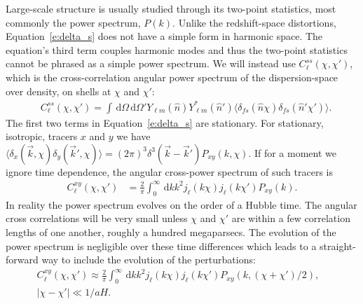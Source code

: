 \documentclass[twocolumn,prl,nofootinbib,floatfix]{revtex4-1}
\newcommand{\ud}{\,\mathrm{d}}
\begin{document}
Large-scale structure is usually studied through its two-point statistics, most
commonly the power spectrum, $P(k)$.
Unlike the redshift-space distortions, Equation~\ref{e:delta_s} does not have a
simple form in harmonic space. The equation's third term couples harmonic modes
and thus the two-point statistics cannot be phrased as a simple power spectrum.
We will instead use $C^{ss}_\ell(\chi,\chi')$, which is
the cross-correlation angular power spectrum of the dispersion-space over density,
on shells at $\chi$ and $\chi'$:
\begin{align}
    &C^{ss}_\ell(\chi, \chi') =
    \int\ud\Omega\ud\Omega' Y_{\ell m}(\hat n) Y^*_{\ell m}(\hat n')
    \langle \delta_{fs}(\hat n \chi) \delta_{fs}(\hat n' \chi')
        \rangle.
\end{align}
The first two terms in Equation~\ref{e:delta_s} are stationary. For stationary,
isotropic, tracers $x$ and $y$ we have 
$\langle \delta_x(\vec k, \chi) \delta_y(\vec k', \chi) \rangle = (2\pi)^3
\delta^3(\vec k - \vec k') P_{xy}(k, \chi)$.  If for a moment we ignore time
dependence, the angular cross-power spectrum of such tracers is
\begin{align}
    C^{xy}_\ell(\chi,\chi')
    &= \frac{2}{\pi}
\int_0^\infty\ud k k^2 j_\ell(k\chi) j_{\ell}(k\chi')P_{xy}(k).
\end{align}
In reality the power spectrum evolves on the order of a Hubble time.
The angular cross correlations will be very small unless $\chi$ and $\chi'$ are
within a few correlation lengths of one another, roughly a hundred
megaparsecs.  The evolution of the power spectrum is negligible over these time
differences which leads to a straight-forward way to include the evolution of
the perturbations:
\begin{align}
C^{xy}_\ell(\chi,\chi') 
    \approx \frac{2}{\pi}
    \int_0^\infty\ud k k^2
    j_\ell(k\chi) j_{\ell}(k\chi')
    P_{xy}(k,(\chi + \chi')/2),\nonumber &\\
    |\chi - \chi'| \ll 1/aH.&
\end{align}
\end{document}
